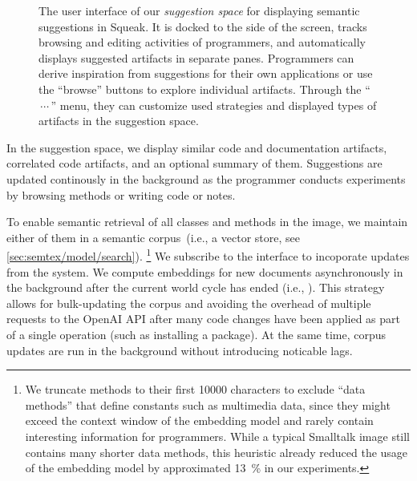 \begin{figure}
	\caption[The user interface of our \emph{suggestion space} for displaying semantic suggestions in Squeak.]{
		The user interface of our \emph{suggestion space} for displaying semantic suggestions in Squeak.
		It is docked to the side of the screen, tracks browsing and editing activities of programmers, and automatically displays suggested artifacts in separate panes.
		Programmers can derive inspiration from suggestions for their own applications or use the ``browse'' buttons to explore individual artifacts.
		Through the ``$\,{\cdots}\,$'' menu, they can customize used strategies and displayed types of artifacts in the suggestion space.
	}
	\label{fig:implementation/suggestions/space}
\end{figure}

In the suggestion space, we display similar code and documentation artifacts, correlated code artifacts, and an optional summary of them.
Suggestions are updated continously in the background as the programmer conducts experiments by browsing methods or writing code or notes.

To enable semantic retrieval of all classes and methods in the image, we maintain either of them in a semantic corpus~(i.e., a vector store, see \cref{sec:semtex/model/search}).
\footnote{We truncate methods to their first \num{10000} characters to exclude ``data methods'' that define constants such as multimedia data, since they might exceed the context window of the embedding model and rarely contain interesting information for programmers. While a typical Smalltalk image still contains many shorter data methods, this heuristic already reduced the usage of the embedding model by approximated \qty{13}{\percent} in our experiments.}
We subscribe to the  interface to incoporate updates from the system.
We compute embeddings for new documents asynchronously in the background after the current world cycle has ended (i.e., ).
This strategy allows for bulk-updating the corpus and avoiding the overhead of multiple requests to the OpenAI API after many code changes have been applied as part of a single operation (such as installing a package).
At the same time, corpus updates are run in the background without introducing noticable lags.
